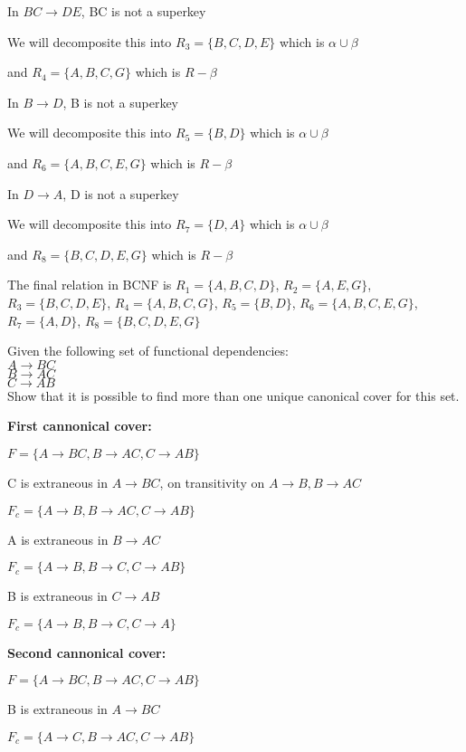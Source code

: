 \documentclass[a4 paper]{article}
\begin{document}
In $BC \rightarrow DE$, BC is not a superkey

We will decomposite this into $R_3 = \{B,C,D,E\}$ which is $\alpha \cup \beta$ 

and $R_4 = \{A,B,C,G\}$ which is $R - \beta$

In $B \rightarrow D$, B is not a superkey

We will decomposite this into $R_5 = \{B,D\}$ which is $\alpha \cup \beta$ 

and $R_6 = \{A,B,C,E,G\}$ which is $R - \beta$

In $D \rightarrow A$, D is not a superkey

We will decomposite this into $R_7 = \{D,A\}$ which is $\alpha \cup \beta$ 

and $R_8 = \{B,C,D,E,G\}$ which is $R - \beta$

The final relation in BCNF is 
$R_1 = \{A,B,C,D\}$, $R_2 = \{A,E,G\}$, $R_3 = \{B,C,D,E\}$, $R_4 = \{A,B,C,G\}$, 
$R_5 = \{B,D\}$, $R_6 = \{A,B,C,E,G\}$, $R_7 = \{A,D\}$, $R_8 = \{B,C,D,E,G\}$


Given the following set of functional dependencies:\\
$A \rightarrow BC$\\
$B \rightarrow AC$\\
$C \rightarrow AB$\\
Show that it is possible to find more than one unique canonical cover for this set.

\textbf{First cannonical cover:}

$F = \{A \rightarrow BC, B \rightarrow AC, C \rightarrow AB\}$

C is extraneous in $A \rightarrow BC$, on transitivity on $A \rightarrow B, B \rightarrow AC$

$F_c = \{A \rightarrow B, B \rightarrow AC, C \rightarrow AB\}$

A is extraneous in $B \rightarrow AC$

$F_c = \{A \rightarrow B, B \rightarrow C, C \rightarrow AB\}$

B is extraneous in $C \rightarrow AB$

$F_c = \{A \rightarrow B, B \rightarrow C, C \rightarrow A\}$

\textbf{Second cannonical cover:}

$F = \{A \rightarrow BC, B \rightarrow AC, C \rightarrow AB\}$

B is extraneous in $A \rightarrow BC$

$F_c = \{A \rightarrow C, B \rightarrow AC, C \rightarrow AB\}$
\end{document}
